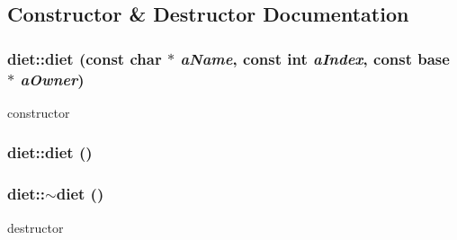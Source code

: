 \subsection{Constructor \& Destructor Documentation}
\hypertarget{classdiet_a3316a2f0434fba4fdfcfc32bcbae57f9}{
\subsubsection[{diet}]{\setlength{\rightskip}{0pt plus 5cm}diet::diet (const char $\ast$ {\em aName}, \/  const int {\em aIndex}, \/  const {\bf base} $\ast$ {\em aOwner})}}
\label{classdiet_a3316a2f0434fba4fdfcfc32bcbae57f9}
constructor \hypertarget{classdiet_a7aa7b6bf6b7849a2c809b3937afef657}{
\subsubsection[{diet}]{\setlength{\rightskip}{0pt plus 5cm}diet::diet ()}}
\label{classdiet_a7aa7b6bf6b7849a2c809b3937afef657}
\hypertarget{classdiet_a84ae4cd84a77e5f6b7ca487cc8083ad4}{
\subsubsection[{$\sim$diet}]{\setlength{\rightskip}{0pt plus 5cm}diet::$\sim$diet ()}}
\label{classdiet_a84ae4cd84a77e5f6b7ca487cc8083ad4}
destructor 

